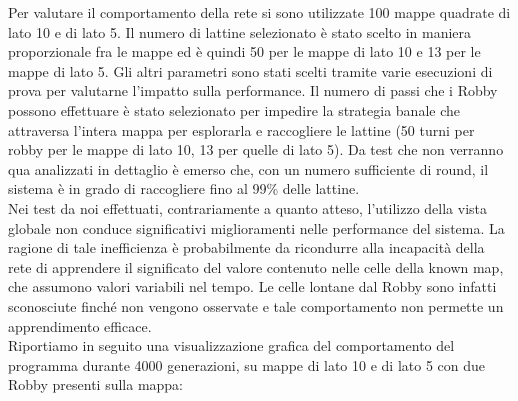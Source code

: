 Per valutare il comportamento della rete si sono utilizzate 100 mappe quadrate 
di lato 10 e di lato 5. Il numero di lattine selezionato è stato scelto in 
maniera proporzionale fra le mappe ed è quindi 50 per le mappe di lato 10 e 13 
per le mappe di lato 5. Gli altri parametri sono stati scelti tramite varie 
esecuzioni di prova per valutarne l'impatto sulla performance. Il numero di 
passi che i Robby possono effettuare è stato selezionato per impedire la 
strategia banale che attraversa l'intera mappa per esplorarla e raccogliere le 
lattine (50 turni per robby per le mappe di lato 10, 13 per quelle di lato 5). 
Da test che non verranno qua analizzati in dettaglio è emerso che, con 
un numero sufficiente di round, il sistema è in grado di raccogliere fino al 
99\% delle lattine.
\\
Nei test da noi effettuati, contrariamente a quanto atteso, l'utilizzo della 
vista globale non conduce significativi miglioramenti nelle performance del 
sistema. La ragione di tale inefficienza è probabilmente da ricondurre alla 
incapacità della rete di apprendere il significato del valore contenuto 
nelle celle della known map, che assumono valori variabili nel tempo. Le celle 
lontane dal Robby sono infatti sconosciute finché non vengono osservate e tale 
comportamento non permette un apprendimento efficace.
\\
Riportiamo in seguito una visualizzazione grafica del comportamento del 
programma durante 4000 generazioni, su mappe di lato 10 e di lato 5 con due
Robby presenti sulla mappa:

